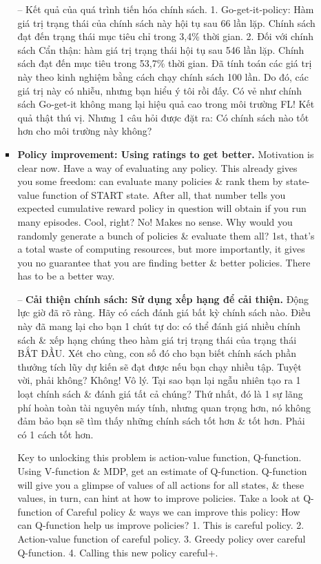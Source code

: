 \documentclass{article}
\begin{document}
\begin{itemize}
\begin{itemize}
\begin{itemize}
            -- {\sf Kết quả của quá trình tiến hóa chính sách.} 1. Go-get-it-policy: Hàm giá trị trạng thái của chính sách này hội tụ sau 66 lần lặp. Chính sách đạt đến trạng thái mục tiêu chỉ trong 3,4\% thời gian. 2. Đối với chính sách Cẩn thận: hàm giá trị trạng thái hội tụ sau 546 lần lặp. Chính sách đạt đến mục tiêu trong 53,7\% thời gian. Đã tính toán các giá trị này theo kinh nghiệm bằng cách chạy chính sách 100 lần. Do đó, các giá trị này có nhiễu, nhưng bạn hiểu ý tôi rồi đấy. Có vẻ như chính sách Go-get-it không mang lại hiệu quả cao trong môi trường FL! Kết quả thật thú vị. Nhưng 1 câu hỏi được đặt ra: Có chính sách nào tốt hơn cho môi trường này không?
            \item {\bf Policy improvement: Using ratings to get better.} Motivation is clear now. Have a way of evaluating any policy. This already gives you some freedom: can evaluate many policies \& rank them by state-value function of START state. After all, that number tells you expected cumulative reward policy in question will obtain if you run many episodes. Cool, right? No! Makes no sense. Why would you randomly generate a bunch of policies \& evaluate them all? 1st, that's a total waste of computing resources, but more importantly, it gives you no guarantee that you are finding better \& better policies. There has to be a better way.

            -- {\bf Cải thiện chính sách: Sử dụng xếp hạng để cải thiện.} Động lực giờ đã rõ ràng. Hãy có cách đánh giá bất kỳ chính sách nào. Điều này đã mang lại cho bạn 1 chút tự do: có thể đánh giá nhiều chính sách \& xếp hạng chúng theo hàm giá trị trạng thái của trạng thái BẮT ĐẦU. Xét cho cùng, con số đó cho bạn biết chính sách phần thưởng tích lũy dự kiến sẽ đạt được nếu bạn chạy nhiều tập. Tuyệt vời, phải không? Không! Vô lý. Tại sao bạn lại ngẫu nhiên tạo ra 1 loạt chính sách \& đánh giá tất cả chúng? Thứ nhất, đó là 1 sự lãng phí hoàn toàn tài nguyên máy tính, nhưng quan trọng hơn, nó không đảm bảo bạn sẽ tìm thấy những chính sách tốt hơn \& tốt hơn. Phải có 1 cách tốt hơn.

            Key to unlocking this problem is action-value function, Q-function. Using V-function \& MDP, get an estimate of Q-function. Q-function will give you a glimpse of values of all actions for all states, \& these values, in turn, can hint at how to improve policies. Take a look at Q-function of Careful policy \& ways we can improve this policy: {\sf How can Q-function help us improve policies?} 1. This is careful policy. 2. Action-value function of careful policy. 3. Greedy policy over careful Q-function. 4. Calling this new policy careful+.


\end{itemize}
\end{itemize}
\end{itemize}
\end{document}
